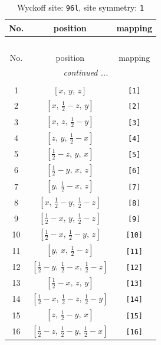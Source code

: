 \documentclass[fleqn,8pt]{jsarticle}
\begin{document}
\renewcommand{\arraystretch}{1.2}
\begin{longtable}{ccc}
\caption{Wyckoff site: {\tt 96l}, site symmetry: {\tt 1}}
 \\
 \hline \hline
No. & position & mapping \\ \hline \endfirsthead

\multicolumn{2}{l}{\tablename\ \thetable{}} \\
 \hline \hline
No. & position & mapping \\ \hline \endhead

 \hline \hline
\multicolumn{2}{r}{\footnotesize\it continued ...} \\ \endfoot

 \hline \hline
\multicolumn{2}{r}{} \\ \endlastfoot

1 & $\left[ x,\, y,\, z \right]$ & {\tt [1]} \\ \hline
2 & $\left[ x,\, \frac{1}{2} - z,\, y \right]$ & {\tt [2]} \\ \hline
3 & $\left[ x,\, z,\, \frac{1}{2} - y \right]$ & {\tt [3]} \\ \hline
4 & $\left[ z,\, y,\, \frac{1}{2} - x \right]$ & {\tt [4]} \\ \hline
5 & $\left[ \frac{1}{2} - z,\, y,\, x \right]$ & {\tt [5]} \\ \hline
6 & $\left[ \frac{1}{2} - y,\, x,\, z \right]$ & {\tt [6]} \\ \hline
7 & $\left[ y,\, \frac{1}{2} - x,\, z \right]$ & {\tt [7]} \\ \hline
8 & $\left[ x,\, \frac{1}{2} - y,\, \frac{1}{2} - z \right]$ & {\tt [8]} \\ \hline
9 & $\left[ \frac{1}{2} - x,\, y,\, \frac{1}{2} - z \right]$ & {\tt [9]} \\ \hline
10 & $\left[ \frac{1}{2} - x,\, \frac{1}{2} - y,\, z \right]$ & {\tt [10]} \\ \hline
11 & $\left[ y,\, x,\, \frac{1}{2} - z \right]$ & {\tt [11]} \\ \hline
12 & $\left[ \frac{1}{2} - y,\, \frac{1}{2} - x,\, \frac{1}{2} - z \right]$ & {\tt [12]} \\ \hline
13 & $\left[ \frac{1}{2} - x,\, z,\, y \right]$ & {\tt [13]} \\ \hline
14 & $\left[ \frac{1}{2} - x,\, \frac{1}{2} - z,\, \frac{1}{2} - y \right]$ & {\tt [14]} \\ \hline
15 & $\left[ z,\, \frac{1}{2} - y,\, x \right]$ & {\tt [15]} \\ \hline
16 & $\left[ \frac{1}{2} - z,\, \frac{1}{2} - y,\, \frac{1}{2} - x \right]$ & {\tt [16]} \\ \hline

\end{longtable}
\end{document}
